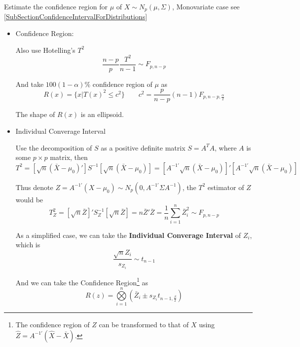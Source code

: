     Estimate the confidence region for $ \mu $ of $ X\sim N_p(\mu,\Sigma ) $, Monovariate case see \autoref{SubSectionConfidenceIntervalForDistributions}
\begin{itemize}
    \item Confidence Region:

    Also use Hotelling's $ T^2 $
    \begin{equation}
         \dfrac{n-p}{p}\dfrac{T^2}{n-1}\sim F_{p,n-p}
    \end{equation}
    
    And take $ 100(1-\alpha )\% $ confidence region of $ \mu $ as
    \begin{equation}
        R(x)=\{x|T(x)^2\leq c^2\}\qquad c^2=\dfrac{p}{n-p}(n-1)F_{p,n-p,\frac{\alpha }{2}} 
    \end{equation}

    The shape of $ R(x) $ is an ellipsoid.
    


    \item Individual Converage Interval
    
    Use the decomposition of $ S $ as a positive definite matrix $ S=A^TA $, where $ A $ is some $ p\times p $ matrix, then
    \begin{equation}
        T^2= [\sqrt{n}(\bar{X}-\mu_0)']S^{-1}[\sqrt{n}(\bar{X}-\mu _0)]=[A^{-1\prime}\sqrt{n}(\bar{X}-\mu_0)]'[A^{-1\prime}\sqrt{n}(\bar{X}-\mu_0)]
    \end{equation}

    Thus denote $ Z=A^{-1\prime}(X-\mu_0) \sim N_p(0,A^{-1\prime}\Sigma A^{-1}) $, the $ T^2 $ estimator of $ Z $ would be
    \begin{equation}
        T_Z^2=[\sqrt{n}\bar{Z}]'S^{-1}_Z [\sqrt{n}\bar{Z}]=n\bar{Z}'\bar{Z}=\dfrac{1}{n}\sum_{i=1}^n\bar{Z}_i^2\sim F_{p,n-p}
    \end{equation}

    As a simplified case, we can take the \textbf{Individual Converage Interval} of $ Z_i $, which is 
    \begin{equation}
        \dfrac{\sqrt{n}Z_i}{s_{Z_i}}\sim t_{n-1} 
    \end{equation}
    
    And we can take the Confidence Region\footnote{The confidence region of $ Z $ can be transformed to that of $ X $ using $ \hat{Z}=A^{-1\prime}(\hat{X}-\bar{X}) $. } as
    \begin{equation}\label{EqaConfidenceRegionUsingBonferroni}
        R(z)= \bigotimes\limits_{i=1}^n(\bar{Z}_i\pm s_{Z_i}t_{n-1,\frac{\beta }{2}})
    \end{equation}
    

\end{itemize}
